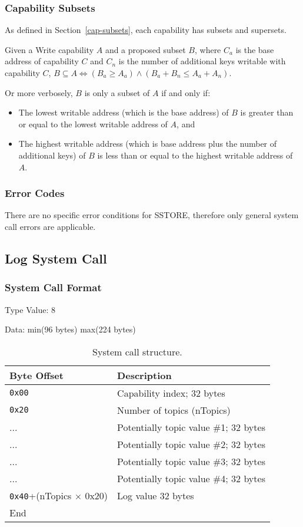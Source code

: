 \documentclass[english,a4paper]{article}
\let\oldparagraph\subsubsection
\renewcommand{\subsubsection}[1]{\oldparagraph{#1}\mbox{}}
\begin{document}
\subsubsection{Capability Subsets}
As defined in Section~\ref{cap-subsets}, each capability has subsets and
supersets.

Given a Write capability $A$ and a proposed subset $B$, where $C_a$ is the base
address of capability $C$ and $C_n$ is the number of additional keys writable
with capability $C$, $B \subseteq A \iff \left(B_a \geq A_a\right) \land
\left(B_a + B_n \leq A_a + A_n\right)$.

Or more verbosely, $B$ is only a subset of $A$ if and only if:
\begin{itemize}
  \item The lowest writable address (which is the base address) of $B$ is
  greater than or equal to the lowest writable address of $A$, and
  \item The highest writable address (which is base address plus the number of
  additional keys) of $B$ is less than or equal to the highest writable address
  of $A$.
\end{itemize}

\subsubsection{Error Codes}
There are no specific error conditions for SSTORE, therefore only general system
call errors are applicable.

\subsection{Log System Call}

\subsubsection{System Call Format}
Type Value: 8

Data: min(96 bytes) max(224 bytes)

\begin{table}[H]
  \caption{System call structure.}
  \centering{}%
  \begin{tabularx}{\textwidth}{l|X}
    \hline
    Byte Offset & Description \\
    \hline
    \hline
    \texttt{0x00} & Capability index; 32 bytes \\
    \texttt{0x20} & Number of topics (nTopics) \\
    ... & Potentially topic value \#1; 32 bytes \\
    ... & Potentially topic value \#2; 32 bytes \\
    ... & Potentially topic value \#3; 32 bytes \\
    ... & Potentially topic value \#4; 32 bytes \\
    \texttt{0x40}+(nTopics $\times$ 0x20) & Log value 32 bytes \\
    \hline
    End &  \\
    \hline
  \end{tabularx}
\end{table}
\end{document}
